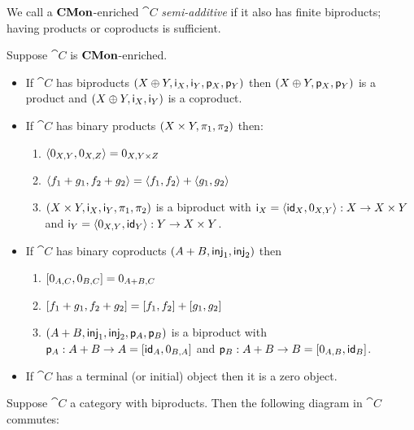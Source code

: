 We call a $\mathbf{CMon}$-enriched $\cat{C}$ \emph{semi-additive} if it also has finite biproducts; having products or
coproducts is sufficient.

\begin{proposition}
\label{prop:biproduct:from-product-or-coproduct}
Suppose $\cat{C}$ is $\mathbf{CMon}$-enriched.
\begin{itemize}
\item If $\cat{C}$ has biproducts $(X \oplus Y, \mathsf{i}_X, \mathsf{i}_Y, \mathsf{p}_X, \mathsf{p}_Y)$ then $(X
\oplus Y, \mathsf{p}_X, \mathsf{p}_Y)$ is a product and $(X \oplus Y, \mathsf{i}_X, \mathsf{i}_Y)$ is a coproduct.
\item If $\cat{C}$ has binary products $(X \times Y, \pi_1, \pi_2)$ then:
\begin{enumerate}
\item $\langle 0_{X,Y}, 0_{X,Z}\rangle = 0_{X,Y \times Z}$
\item $\langle f_1 + g_1, f_2 + g_2\rangle = \langle f_1, f_2\rangle + \langle g_1, g_2\rangle$
\item $(X \times Y, \mathsf{i}_X, \mathsf{i}_Y, \pi_1, \pi_2)$ is a biproduct with $\mathsf{i}_X =
\langle \mathsf{id}_X, 0_{X,Y}\rangle: X \to X \times Y$ and $\mathsf{i}_Y = \langle 0_{X,Y}, \mathsf{id}_Y\rangle: Y \to X \times Y$.
\end{enumerate}
\item If $\cat{C}$ has binary coproducts $(A + B, \mathsf{inj}_1, \mathsf{inj}_2)$ then
\begin{enumerate}
\item $[0_{A,C}, 0_{B,C}] = 0_{A + B,C}$
\item $[f_1 + g_1, f_2 + g_2] = [f_1, f_2] + [g_1, g_2]$
\item $(A + B, \mathsf{inj}_1, \mathsf{inj}_2, \mathsf{p}_A, \mathsf{p}_B)$ is a
biproduct with $\mathsf{p}_A: A + B \to A = [\mathsf{id}_A, 0_{B,A}]$ and $\mathsf{p}_B: A + B \to B =
[0_{A,B}, \mathsf{id}_B]$.
\end{enumerate}
\item If $\cat{C}$ has a terminal (or initial) object then it is a zero object.
\end{itemize}
\end{proposition}

\begin{proposition}
\label{prop:biproduct:prod-coprod}
Suppose $\cat{C}$ a category with biproducts. Then the following diagram in $\cat{C}$ commutes:

\begin{center}
\end{center}
\end{proposition}

